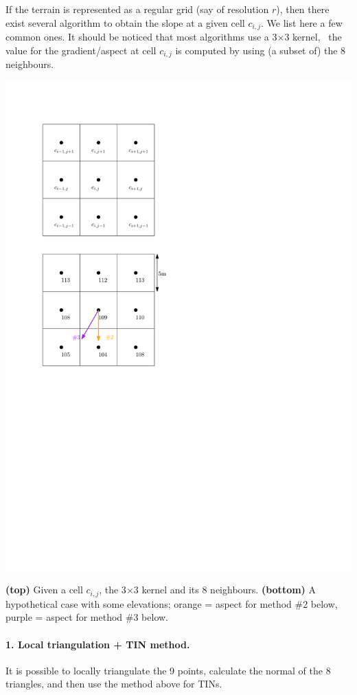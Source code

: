 If the terrain is represented as a regular grid (say of resolution $r$), then there exist several algorithm to obtain the slope at a given cell $c_{i,j}$.
We list here a few common ones.
It should be noticed that most algorithms use a 3$\times$3 kernel, \ie\ the value for the gradient/aspect at cell $c_{i,j}$ is computed by using (a subset of) the 8 neighbours.
\begin{marginfigure}
  \centering
  \includegraphics[width=\linewidth]{figs/slope_grid}
  \caption{\textbf{(top)} Given a cell $c_{i,j}$, the 3$\times$3 kernel and its 8 neighbours. \textbf{(bottom)} A hypothetical case with some elevations; orange = aspect for method \#2 below, purple = aspect for method \#3 below.}%
\label{fig:slope_grid}
\end{marginfigure}


\paragraph{1. Local triangulation + TIN method.}
It is possible to locally triangulate the 9 points, calculate the normal of the 8 triangles, and then use the method above for TINs.


